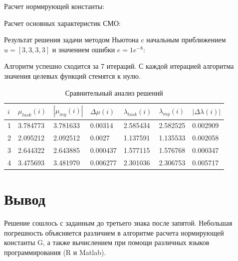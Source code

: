\documentclass[14pt,a4paper,report]{report}
\begin{document}


Расчет нормирующей константы:



Расчет основных характеристик СМО:



Результат решения задачи методом Ньютона  c начальным приближением $u=[3, 3, 3, 3]$ и значением ошибки $e=1e^{-8}$:



Алгоритм успешно сходится за 7 итераций. С каждой итерацией алгоритма значения целевых функций стемятся к нулю.

\begin{table}[h!]
	\centering
	\bgroup
	\captionsetup{singlelinecheck = false, format= hang, justification=raggedleft, font=footnotesize, labelsep=space}
	\caption{Сравнительный анализ решений}
	\def\arraystretch{1}
	\begin{tabular}{ | m{0.21cm} | m{1.25cm} | m{1.25cm} | m{1.25cm} | m{1.25cm} | m{1.25cm} | m{1.25cm} |}
		\hline
		$i$ & $\mu_{task}(i)$ & $|\mu_{my}(i)|$ & $\Delta\mu(i)$ & $\lambda_{task}(i)$ & $\lambda_{my}(i)$ & $|\Delta\lambda(i)|$ \\ \hline
		1 & 3.784773 & 3.781633 & 0.00314 & 2.585434 & 2.582525 & 0.002909 \\ \hline
		2 & 2.095212 & 2.092512 & 0.0027 & 1.137591 & 1.135533 & 0.002058 \\ \hline
		3 & 2.644322 & 2.643885 & 0.000437 & 1.577115 & 1.576768 & 0.000347 \\ \hline
		4 & 3.475693 & 3.481970 & 0.006277 & 2.301036 & 2.306753 & 0.005717 \\
		\hline
	\end{tabular}
	\egroup
\end{table}


\section{Вывод}

Решение сошлось с заданным до третьего знака после запятой. Небольшая погрешность объясняется различием в алгоритме расчета нормирующей константы G, а также вычислением при помощи различных языков программирования (R и Matlab). 
\end{document}
